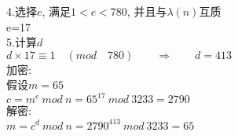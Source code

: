 \documentclass[UTF8, fontset=ubuntu]{ctexart}
\begin{document}
    \phantom{\hspace{1cm}}4.选择$e$, 满足$1<e<780$, 并且与$\lambda(n)$互质\\
    \phantom{\hspace{2cm}}e=17\\
    \phantom{\hspace{1cm}}5.计算$d$\\
    \phantom{\hspace{2cm}}$d\times 17\equiv 1\quad(mod\quad 780)\qquad\Longrightarrow\qquad d=413$\\
    加密:\\
    \phantom{\hspace{1cm}}假设$m=65$\\
    \phantom{\hspace{1cm}}$c=m^e\ mod\ n=65^{17}\ mod\ 3233=2790$\\
    解密:\\
    \phantom{\hspace{1cm}}$m=c^d\ mod\ n=2790^{413}\ mod\ 3233=65$\\
\end{document}
